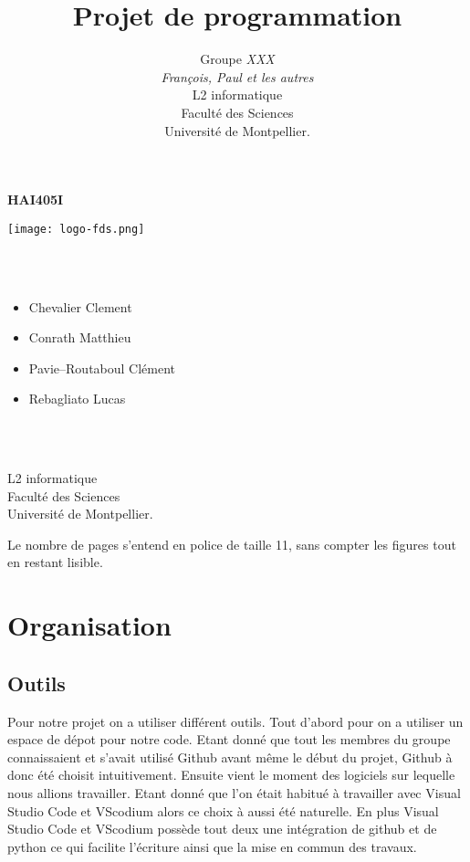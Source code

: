\documentclass[a4paper, 12pt]{article}
\title{         %
  Projet de programmation}
\author{Groupe \emph{XXX}\\
  \emph{François, Paul et les autres}\\
    L2 informatique\\
  Faculté des Sciences\\
Université de Montpellier.}
\begin{document}
\centerline{\Huge\bf HAI405I}
\vspace*{1.5cm}
\begin{center}               %
	
	
  \texttt{[image: logo-fds.png]}   %
	

\end{center}
\vspace*{1.5cm}


\vspace*{1.5cm}

\\ \\

\begin{itemize}\large
\item Chevalier Clement\large
\item Conrath Matthieu\large
\item Pavie--Routaboul Clément\large
\item Rebagliato Lucas\large
\end{itemize}
\\
\\
\vspace*{1.5cm}
\begin{center}
  L2 informatique\\
  Faculté des Sciences\\
Université de Montpellier.
\end{center}

\newpage
Le nombre de pages s'entend en police de taille 11, sans compter les figures tout en restant lisible.

\section{Organisation}

\subsection{Outils}
Pour notre projet on a utiliser différent outils. Tout d'abord pour on a utiliser un espace de dépot pour notre code. Etant donné que tout les membres du groupe connaissaient et s'avait utilisé Github avant même le début du projet, Github à donc été choisit intuitivement. Ensuite vient le moment des logiciels sur lequelle nous allions travailler. Etant donné que l'on était habitué à travailler avec Visual Studio Code et VScodium alors ce choix à aussi été naturelle. En plus Visual Studio Code et VScodium possède tout deux une intégration de github et de python ce qui facilite l'écriture ainsi que la mise en commun des travaux.
\end{document}
